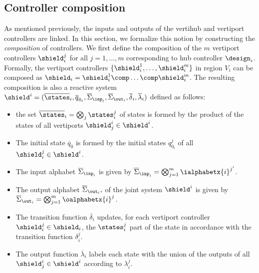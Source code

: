 \subsection{Controller composition}\label{sec:comp}
As mentioned previously, the inputs and outputs of the vertihub and vertiport controllers are linked. In this section, we formalize this notion by constructing the \emph{composition} of controllers.
We first define the composition of the $m$ vertiport controllers $\shield_i^j$ for all $j = 1,\dots,m$ corresponding to hub controller $\design_i$.
Formally, the vertiport controllers $\{\shield_i^1, \ldots,\shield_i^m\}$ in region $V_i$ can be composed as $\shield_i = \shield_i^1 \comp \ldots \comp \shield_i^m$. %
The resulting composition is also a reactive system
$\shield^i=(\overline{\states}_i, \overline{q}_{0_i},\overline{\Sigma}_{\inp_i}, \overline{\Sigma}_{\out_i}, \overline{\delta}_i, \overline{\lambda}_i)$ defined as follows:
\begin{itemize}
    \item the set $\overline{\states}_i = \bigotimes_j \states_i^j$ of states is formed by the product of the states of all vertiports $\shield^i_j \in \shield^i$.
    \item The initial state $\overline{q}_{0}$ is formed by the initial states $q_{0_i}^j$ of all $\shield_i^j \in \shield^i$.
    \item The input alphabet $\overline{\Sigma}_{\inp_i}$ is given by $\overline{\Sigma}_{\inp_i}  = \bigotimes_{j=1}^m \ialphabetx{i}^{j'}$.
    \item The output alphabet $\overline{\Sigma}_{\out_i},$ of the joint system  $\shield^i$ is given by $\overline{\Sigma}_{\out_i} = \bigotimes_{j=1}^m \oalphabetx{i}^j$.
    \item The transition function $\overline{\delta}_i$ updates, for each vertiport controller $\shield_i^j \in \shield_i$, the $\states^j_i$ part of the state 
    in accordance with the transition function $\delta^j_i$.
\item The output function $\overline{\lambda}_i$ labels each state with the union of the outputs of all $\shield^i_j \in \shield^i$ according to $\lambda^j_i$.
\end{itemize}

%






